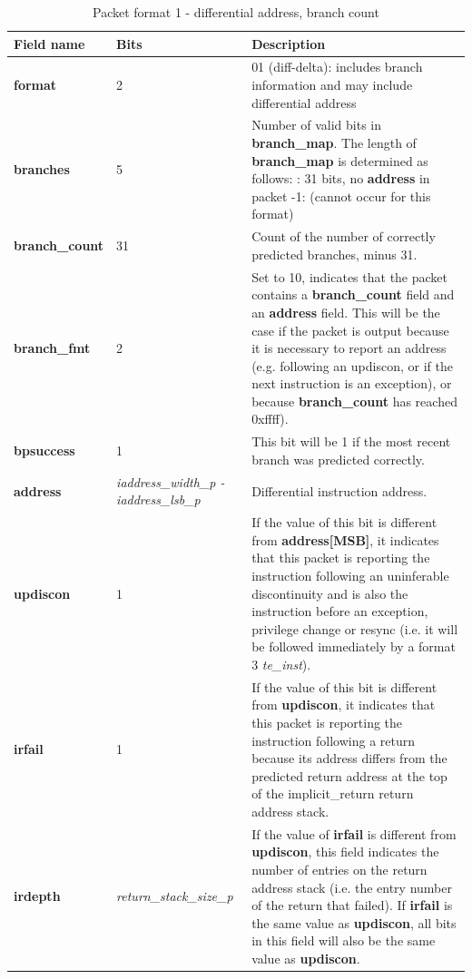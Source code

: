 \begin{table}[htp]
  \centering
  \caption{Packet format 1 - differential address, branch count}
  \label{tab:te_inst0-1-addr-count}
  \begin{tabulary}{\textwidth}{|l|p{35mm}|p{90mm}|}
    \hline
    {\bf Field name} & {\bf Bits} & {\bf Description} \\
    \hline
    \textbf{format}	& 2	& 01 (diff-delta): includes branch information and may include differential address\\
    \hline
    \textbf{branches} & 5 & Number of valid bits in \textbf{branch\_map}. The length of \textbf{branch\_map} is determined as follows: :    31 bits, no \textbf{address} in packet -1: (cannot occur for this format) \\
    \hline
    \textbf{branch\_count} & 31 & Count of the number of correctly predicted branches, minus 31. \\
    \hline
    \textbf{branch\_fmt} & 2 & Set to 10, indicates that the packet contains a \textbf{branch\_count} field and
     an \textbf{address} field. This will be the case if the packet is output because it is necessary to report an
     address (e.g. following an updiscon, or if the next instruction is an exception), or because \textbf{branch\_count} 
     has reached 0xffff).\\
    \hline
    \textbf{bpsuccess} & 1 & This bit will be 1 if the most recent branch was predicted correctly. \\
    \hline
    \textbf{address}	& \textit {iaddress\_width\_p - iaddress\_lsb\_p} & 
                Differential instruction address.\\
    \hline
    \textbf{updiscon}	& 1 & 
                If the value of this bit is different from \textbf{address[MSB]}, it indicates that this 
                packet is reporting the instruction following an uninferable discontinuity and is also the 
                instruction before an exception, privilege change or resync 
                (i.e. it will be followed immediately by a format 3 \textit{te\_inst}).\\
    \hline
    \textbf{irfail}	& 1 & 
                If the value of this bit is different from \textbf{updiscon}, it indicates that this
                packet is reporting the instruction following a return because its address differs from 
                the predicted return address at the top of the implicit\_return return address stack.\\
    \hline
    \textbf{irdepth}	& \textit {return\_stack\_size\_p} & 
                If the value of \textbf{irfail} is different from \textbf{updiscon}, this field indicates 
                the number of entries on the return address stack (i.e. the entry number of the return that
                failed).  If \textbf{irfail} is the same value as \textbf{updiscon}, all bits in this field 
                will also be the same value as \textbf{updiscon}. \\
    \hline
  \end{tabulary}
\end{table}

